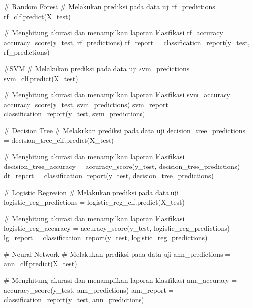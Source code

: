 \documentclass[
  letterpaper,
]{krantz}
\makeatletter
\newenvironment{Shaded}{\begin{snugshade}}{\end{snugshade}}
\newcommand{\CommentTok}[1]{\textcolor[rgb]{0.37,0.37,0.37}{#1}}
\newcommand{\NormalTok}[1]{\textcolor[rgb]{0.00,0.23,0.31}{#1}}
\newcommand{\OperatorTok}[1]{\textcolor[rgb]{0.37,0.37,0.37}{#1}}
\newenvironment{kframe}{%
\medskip{}
\setlength{\fboxsep}{.8em}
 \def\at@end@of@kframe{}%
 \ifinner\ifhmode%
  \def\at@end@of@kframe{\end{minipage}}%
  \begin{minipage}{\columnwidth}%
 \fi\fi%
 \def\FrameCommand##1{\hskip\@totalleftmargin \hskip-\fboxsep
 \colorbox{shadecolor}{##1}\hskip-\fboxsep
     \hskip-\linewidth \hskip-\@totalleftmargin \hskip\columnwidth}%
 \MakeFramed {\advance\hsize-\width
   \@totalleftmargin\z@ \linewidth\hsize
   \@setminipage}}%
 {\par\unskip\endMakeFramed%
 \at@end@of@kframe}
\renewenvironment{Shaded}{\begin{kframe}}{\end{kframe}}
\makeatother
\begin{document}
\begin{Shaded}
\begin{Highlighting}[]
\CommentTok{\# Random Forest}
\CommentTok{\# Melakukan prediksi pada data uji}
\NormalTok{rf\_predictions }\OperatorTok{=}\NormalTok{ rf\_clf.predict(X\_test)}

\CommentTok{\# Menghitung akurasi dan menampilkan laporan klasifikasi}
\NormalTok{rf\_accuracy }\OperatorTok{=}\NormalTok{ accuracy\_score(y\_test, rf\_predictions)}
\NormalTok{rf\_report }\OperatorTok{=}\NormalTok{ classification\_report(y\_test, rf\_predictions)}



\CommentTok{\#SVM}
\CommentTok{\# Melakukan prediksi pada data uji}
\NormalTok{svm\_predictions }\OperatorTok{=}\NormalTok{ svm\_clf.predict(X\_test)}

\CommentTok{\# Menghitung akurasi dan menampilkan laporan klasifikasi}
\NormalTok{svm\_accuracy }\OperatorTok{=}\NormalTok{ accuracy\_score(y\_test, svm\_predictions)}
\NormalTok{svm\_report }\OperatorTok{=}\NormalTok{ classification\_report(y\_test, svm\_predictions)}


\CommentTok{\# Decision Tree}
\CommentTok{\# Melakukan prediksi pada data uji}
\NormalTok{decision\_tree\_predictions }\OperatorTok{=}\NormalTok{ decision\_tree\_clf.predict(X\_test)}

\CommentTok{\# Menghitung akurasi dan menampilkan laporan klasifikasi}
\NormalTok{decision\_tree\_accuracy }\OperatorTok{=}\NormalTok{ accuracy\_score(y\_test, decision\_tree\_predictions)}
\NormalTok{dt\_report }\OperatorTok{=}\NormalTok{ classification\_report(y\_test, decision\_tree\_predictions)}

\CommentTok{\# Logistic Regresion}
\CommentTok{\# Melakukan prediksi pada data uji}
\NormalTok{logistic\_reg\_predictions }\OperatorTok{=}\NormalTok{ logistic\_reg\_clf.predict(X\_test)}

\CommentTok{\# Menghitung akurasi dan menampilkan laporan klasifikasi}
\NormalTok{logistic\_reg\_accuracy }\OperatorTok{=}\NormalTok{ accuracy\_score(y\_test, logistic\_reg\_predictions)}
\NormalTok{lg\_report }\OperatorTok{=}\NormalTok{ classification\_report(y\_test, logistic\_reg\_predictions)}


\CommentTok{\# Neural Network}
\CommentTok{\# Melakukan prediksi pada data uji}
\NormalTok{ann\_predictions }\OperatorTok{=}\NormalTok{ ann\_clf.predict(X\_test)}

\CommentTok{\# Menghitung akurasi dan menampilkan laporan klasifikasi}
\NormalTok{ann\_accuracy }\OperatorTok{=}\NormalTok{ accuracy\_score(y\_test, ann\_predictions)}
\NormalTok{ann\_report }\OperatorTok{=}\NormalTok{ classification\_report(y\_test, ann\_predictions)}
\end{Highlighting}
\end{Shaded}
\end{document}
